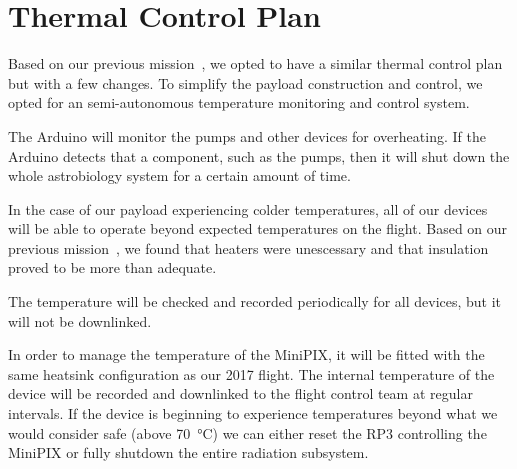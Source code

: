 \section{Thermal Control Plan}
\label{sec:TCP}
Based on our previous mission~\cite{SORA}, we opted to have a similar thermal control plan but with a few changes.  To simplify the payload construction and control, we opted for an semi-autonomous temperature monitoring and control system.  

The Arduino will monitor the pumps and other devices for overheating.  If the Arduino detects that a component, such as the pumps, then it will shut down the whole astrobiology system for a certain amount of time.

In the case of our payload experiencing colder temperatures, all of our devices will be able to operate beyond expected temperatures on the flight. Based on our previous mission~\cite{SORA}, we found that heaters were unescessary and that insulation proved to be more than adequate.

The temperature will be checked and recorded periodically for all devices, but it will not be downlinked.

In order to manage the temperature of the  MiniPIX, it will be fitted with the same heatsink configuration as our 2017 flight. The internal temperature of the device will be recorded and downlinked to the flight control team at regular intervals. If the device is beginning to experience temperatures beyond what we would consider safe (above \SI{70}{\celsius}) we can either reset the RP3 controlling the MiniPIX or fully shutdown the entire radiation subsystem.


